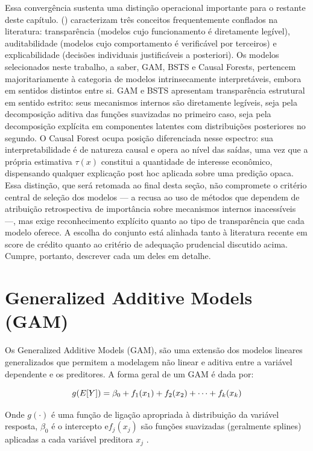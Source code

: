 \documentclass[	12pt, Times, openright, oneside, a4paper, english, brazil]{abntex2}
\begin{document}
Essa convergência sustenta uma distinção operacional importante para o restante deste capítulo. \citeauthor{bucker2022credit} (\citeyear{bucker2022credit}) caracterizam três conceitos frequentemente conflados na literatura: transparência (modelos cujo funcionamento é diretamente legível), auditabilidade (modelos cujo comportamento é verificável por terceiros) e explicabilidade (decisões individuais justificáveis a posteriori). Os modelos selecionados neste trabalho, a saber, GAM, BSTS e Causal Forests, pertencem majoritariamente à categoria de modelos intrinsecamente interpretáveis, embora em sentidos distintos entre si. GAM e BSTS apresentam transparência estrutural em sentido estrito: seus mecanismos internos são diretamente legíveis, seja pela decomposição aditiva das funções suavizadas no primeiro caso, seja pela decomposição explícita em componentes latentes com distribuições posteriores no segundo. O Causal Forest ocupa posição diferenciada nesse espectro: sua interpretabilidade é de natureza causal e opera ao nível das saídas, uma vez que a própria estimativa $\tau(x)$ constitui a quantidade de interesse econômico, dispensando qualquer explicação post hoc aplicada sobre uma predição opaca. Essa distinção, que será retomada ao final desta seção, não compromete o critério central de seleção dos modelos — a recusa ao uso de métodos que dependem de atribuição retrospectiva de importância sobre mecanismos internos inacessíveis —, mas exige reconhecimento explícito quanto ao tipo de transparência que cada modelo oferece. A escolha do conjunto está alinhada tanto à literatura recente em score de crédito \cite{bracke2025fairness} quanto ao critério de adequação prudencial discutido acima. Cumpre, portanto, descrever cada um deles em detalhe.

\section{Generalized Additive Models (GAM)}

Os Generalized Additive Models (GAM), são uma extensão dos modelos lineares generalizados que permitem a modelagem não linear e aditiva entre a variável dependente e os preditores. A forma geral de um GAM é dada por:

\begin{equation}\hfill
g({E}[Y]) = \beta_0 + f_1(x_1) + f_2(x_2) + \cdots + f_k(x_k)
\label{eq:gam}
\end{equation}

Onde $g(\cdot)$ é uma função de ligação apropriada à distribuição da variável resposta, $\beta_0$ é o intercepto e$f_j(x_j)$ são funções suavizadas (geralmente splines) aplicadas a cada variável preditora $x_j$ \cite{Yang2023Climate}.
\end{document}
